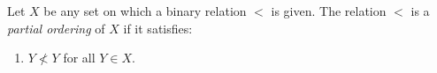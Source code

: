 Let $X$ be any set on which a binary relation $<$ is given. The relation $<$ is a \textit{partial ordering} of $X$ if it satisfies:

\begin{enumerate}
\item[(a)] $Y \not< Y$ for all $Y \in X$.
\end{enumerate}
